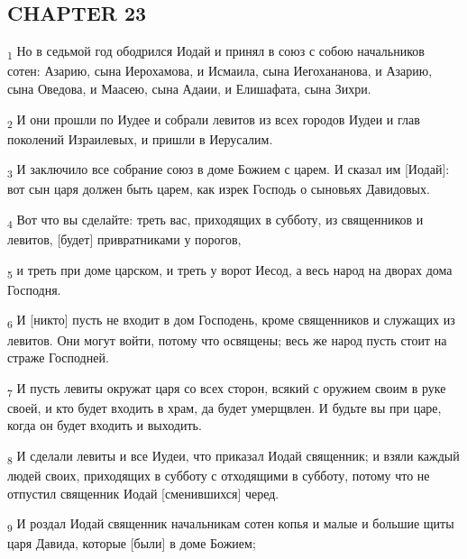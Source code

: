 \subsection{CHAPTER 23}
\begin{tcolorbox}
\textsubscript{1} Но в седьмой год ободрился Иодай и принял в союз с собою начальников сотен: Азарию, сына Иерохамова, и Исмаила, сына Иегохананова, и Азарию, сына Оведова, и Маасею, сына Адаии, и Елишафата, сына Зихри.
\end{tcolorbox}
\begin{tcolorbox}
\textsubscript{2} И они прошли по Иудее и собрали левитов из всех городов Иудеи и глав поколений Израилевых, и пришли в Иерусалим.
\end{tcolorbox}
\begin{tcolorbox}
\textsubscript{3} И заключило все собрание союз в доме Божием с царем. И сказал им [Иодай]: вот сын царя должен быть царем, как изрек Господь о сыновьях Давидовых.
\end{tcolorbox}
\begin{tcolorbox}
\textsubscript{4} Вот что вы сделайте: треть вас, приходящих в субботу, из священников и левитов, [будет] привратниками у порогов,
\end{tcolorbox}
\begin{tcolorbox}
\textsubscript{5} и треть при доме царском, и треть у ворот Иесод, а весь народ на дворах дома Господня.
\end{tcolorbox}
\begin{tcolorbox}
\textsubscript{6} И [никто] пусть не входит в дом Господень, кроме священников и служащих из левитов. Они могут войти, потому что освящены; весь же народ пусть стоит на страже Господней.
\end{tcolorbox}
\begin{tcolorbox}
\textsubscript{7} И пусть левиты окружат царя со всех сторон, всякий с оружием своим в руке своей, и кто будет входить в храм, да будет умерщвлен. И будьте вы при царе, когда он будет входить и выходить.
\end{tcolorbox}
\begin{tcolorbox}
\textsubscript{8} И сделали левиты и все Иудеи, что приказал Иодай священник; и взяли каждый людей своих, приходящих в субботу с отходящими в субботу, потому что не отпустил священник Иодай [сменившихся] черед.
\end{tcolorbox}
\begin{tcolorbox}
\textsubscript{9} И роздал Иодай священник начальникам сотен копья и малые и большие щиты царя Давида, которые [были] в доме Божием;
\end{tcolorbox}
